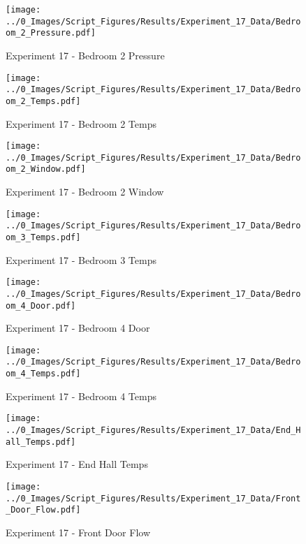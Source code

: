 	\clearpage

	\begin{figure}[H]
		\centering
		\texttt{[image: ../0\_Images/Script\_Figures/Results/Experiment\_17\_Data/Bedroom\_2\_Pressure.pdf]}
		\caption[]{Experiment 17 - Bedroom 2 Pressure}
	\end{figure}
 

	\begin{figure}[H]
		\centering
		\texttt{[image: ../0\_Images/Script\_Figures/Results/Experiment\_17\_Data/Bedroom\_2\_Temps.pdf]}
		\caption[]{Experiment 17 - Bedroom 2 Temps}
	\end{figure}
 
	\clearpage

	\begin{figure}[H]
		\centering
		\texttt{[image: ../0\_Images/Script\_Figures/Results/Experiment\_17\_Data/Bedroom\_2\_Window.pdf]}
		\caption[]{Experiment 17 - Bedroom 2 Window}
	\end{figure}
 

	\begin{figure}[H]
		\centering
		\texttt{[image: ../0\_Images/Script\_Figures/Results/Experiment\_17\_Data/Bedroom\_3\_Temps.pdf]}
		\caption[]{Experiment 17 - Bedroom 3 Temps}
	\end{figure}
 
	\clearpage

	\begin{figure}[H]
		\centering
		\texttt{[image: ../0\_Images/Script\_Figures/Results/Experiment\_17\_Data/Bedroom\_4\_Door.pdf]}
		\caption[]{Experiment 17 - Bedroom 4 Door}
	\end{figure}
 

	\begin{figure}[H]
		\centering
		\texttt{[image: ../0\_Images/Script\_Figures/Results/Experiment\_17\_Data/Bedroom\_4\_Temps.pdf]}
		\caption[]{Experiment 17 - Bedroom 4 Temps}
	\end{figure}
 
	\clearpage

	\begin{figure}[H]
		\centering
		\texttt{[image: ../0\_Images/Script\_Figures/Results/Experiment\_17\_Data/End\_Hall\_Temps.pdf]}
		\caption[]{Experiment 17 - End Hall Temps}
	\end{figure}
 

	\begin{figure}[H]
		\centering
		\texttt{[image: ../0\_Images/Script\_Figures/Results/Experiment\_17\_Data/Front\_Door\_Flow.pdf]}
		\caption[]{Experiment 17 - Front Door Flow}
	\end{figure}
 
